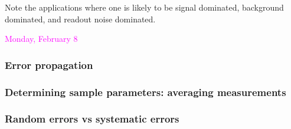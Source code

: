 \documentclass[12pt]{article}
\begin{document}
Note the applications where one is likely to be signal dominated,
background dominated, and readout noise dominated.

\textcolor{magenta}{Monday, February 8}

\subsubsection*{Error propagation}
\subsubsection*{Determining sample parameters: averaging measurements}
\subsubsection*{Random errors vs systematic errors}
\end{document}
